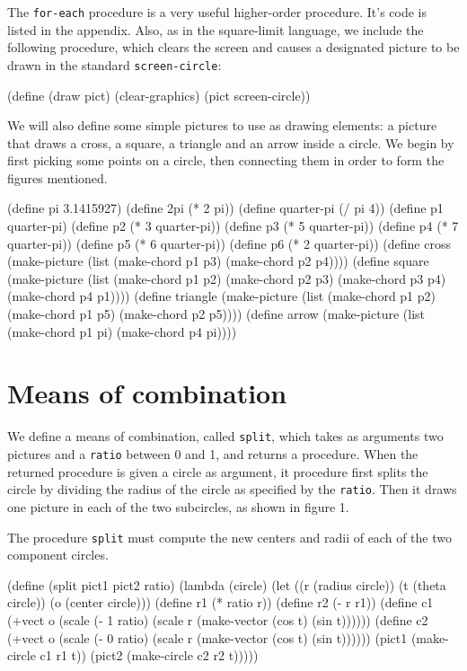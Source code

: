The {\tt for-each} procedure is a very useful higher-order
procedure.  It's code is listed in the appendix.
Also, as in the square-limit language, we include the following
procedure, which clears the screen and causes a designated picture to
be drawn in the standard {\tt screen-circle}:

\beginlisp
(define (draw pict)
  (clear-graphics)
  (pict screen-circle))
\endlisp

We will also define some simple pictures to use as drawing elements:
a picture that draws a cross, a square, a triangle and an arrow inside
a circle.  We begin by first picking some points on a circle, then
connecting them in order to form the figures mentioned.

\beginlisp
(define pi 3.1415927)
(define 2pi (* 2 pi))
(define quarter-pi (/ pi 4))
(define p1 quarter-pi)
(define p2 (* 3 quarter-pi))
(define p3 (* 5 quarter-pi))
(define p4 (* 7 quarter-pi))
(define p5 (* 6 quarter-pi))
(define p6 (* 2 quarter-pi))
\pbrk
(define cross (make-picture (list (make-chord p1 p3)
                                  (make-chord p2 p4))))
\pbrk
(define square (make-picture (list (make-chord p1 p2)
                                   (make-chord p2 p3)
                                   (make-chord p3 p4)
                                   (make-chord p4 p1))))
\pbrk
(define triangle (make-picture (list (make-chord p1 p2)
                                     (make-chord p1 p5)
                                     (make-chord p2 p5))))
\pbrk
(define arrow (make-picture (list (make-chord p1 pi)
                                  (make-chord p4 pi))))
\endlisp

\section{Means of combination}

We define a means of combination, called {\tt split}, which takes
as arguments two pictures and a {\tt ratio} between 0 and 1, and returns
a procedure.  When the returned procedure is given 
a circle as argument, it procedure first splits the
circle by dividing the radius of the circle as specified by the
{\tt ratio}.  Then it draws one picture in each of the two subcircles,
as shown in figure 1.

\beginfigure
\vskip 4in
\endfigure

The procedure {\tt split} must compute the new centers and radii of
each of the two component circles.

\beginlisp
(define (split pict1 pict2 ratio)
  (lambda (circle)
    (let ((r (radius circle))
          (t (theta circle))
          (o (center circle)))
      (define r1 (* ratio r))
      (define r2 (- r r1))
      (define c1 (+vect o (scale (- 1 ratio)
                                 (scale r (make-vector (cos t) (sin t))))))  
      (define c2 (+vect o (scale (- 0 ratio)
                                 (scale r (make-vector (cos t) (sin t))))))
      (pict1 (make-circle c1 r1 t))
      (pict2 (make-circle c2 r2 t)))))
\endlisp

